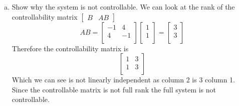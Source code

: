 \documentclass{article}
\begin{document}
\begin{enumerate}[a.]
\item Show why the system is not controllable.
\newline
We can look at the rank of the controllability matrix $\begin{bmatrix} B & AB \end{bmatrix}$
$$ AB =
\begin{bmatrix}
-1 &  4 \\
 4 & -1 \\
\end{bmatrix}
\begin{bmatrix}
1 \\
1 \\
\end{bmatrix}
=
\begin{bmatrix}
3 \\
3 \\
\end{bmatrix}
$$
Therefore the controllability matrix is
$$
\begin{bmatrix}
1 & 3 \\
1 & 3 \\
\end{bmatrix}
$$
Which we can see is not linearly independent as column 2 is $3$ column 1.
Since the controllable matrix is not full rank the full system is not controllable.


\end{enumerate}
\end{document}
